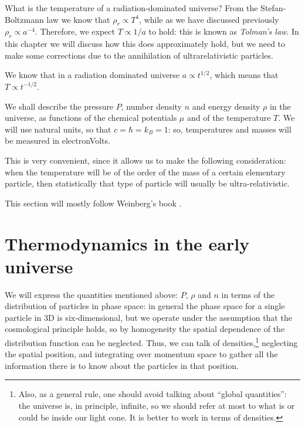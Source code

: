 \documentclass[main.tex]{subfiles}
\begin{document}

What is the temperature of a radiation-dominated universe?
From the Stefan-Boltzmann law we know that \(\rho _r \propto T^{4}\), while as we have discussed previously \(\rho _r \propto a^{-4}\).
Therefore, we expect \(T \propto 1/a\) to hold: this is known as \emph{Tolman's law}.
In this chapter we will discuss how this does approximately hold, but we need to make some corrections due to the annihilation of ultrarelativistic particles.

We know that in a radiation dominated universe \(a \propto t^{1/2}\), which means that \(T \propto t^{-1/2}\).

We shall describe the pressure \(P\), number density \(n\) and energy density \(\rho  \) in the universe, as functions of the chemical potentials \(\mu \) and of  the temperature \(T\).
We will use natural units, so that \(c= \hbar = k_B = 1\): so, temperatures and masses will be measured in electronVolts. 

This is very convenient, since it allows us to make the following consideration: when the temperature will be of the order of the mass of a certain elementary particle, then statistically that type of particle will usually be ultra-relativistic.

This section will mostly follow Weinberg's book \cite[page 538, section 15.6]{weinbergGravitationCosmologyPrinciples1972}.

\section{Thermodynamics in the early universe}

We will express the quantities mentioned above: \(P\), \(\rho \) and \(n\) in terms of the distribution of particles in phase space: in general the phase space for a single particle in 3D is six-dimensional, but we operate under the assumption that the cosmological principle holds, so by homogeneity the spatial dependence of the distribution function can be neglected. 
Thus, we can talk of densities,\footnote{Also, as a general rule, one should avoid talking about ``global quantities'': the universe is, in principle, infinite, so we should refer at most to what is or could be inside our light cone. It is better to work in terms of densities.} neglecting the spatial position, and integrating over momentum space to gather all the information there is to know about the particles in that position.
\end{document}
